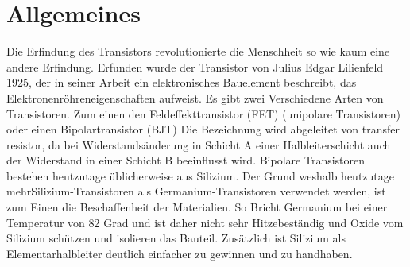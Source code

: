 \section{Allgemeines}
Die Erfindung des Transistors revolutionierte die Menschheit so wie kaum eine andere
Erfindung.
Erfunden wurde der Transistor von Julius Edgar Lilienfeld 1925, der in seiner Arbeit ein
elektronisches Bauelement beschreibt, das Elektronenröhreneigenschaften aufweist.
Es gibt zwei Verschiedene Arten von Transistoren. Zum einen den Feldeffekttransistor (FET)
(unipolare Transistoren) oder einen Bipolartransistor (BJT)
Die Bezeichnung wird abgeleitet von transfer resistor, da bei Widerstandsänderung in Schicht A
einer Halbleiterschicht auch der Widerstand in einer Schicht B beeinflusst wird.
Bipolare Transistoren bestehen heutzutage üblicherweise aus Silizium. Der Grund weshalb heutzutage mehrSilizium-Transistoren als Germanium-Transistoren verwendet werden, ist zum Einen  die Beschaffenheit der Materialien. So Bricht Germanium bei einer Temperatur von 82 Grad und ist daher nicht sehr Hitzebest\"andig und Oxide vom Silizium sch\"utzen und isolieren das Bauteil. Zus\"atzlich ist Silizium als Elementarhalbleiter deutlich einfacher zu gewinnen und zu handhaben. 
